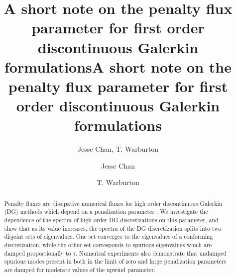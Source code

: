 \documentclass[preprint,10pt]{elsarticle}
\date{}
\author{Jesse Chan, T. Warburton}
\title{A short note on the penalty flux parameter for first order discontinuous Galerkin formulations}
\begin{document}
\begin{frontmatter}
\title{A short note on the penalty flux parameter for first order discontinuous Galerkin formulations}

\author[rice]{Jesse Chan}
\author[vt]{T. Warburton}
\address[rice]{Department of Computational and Applied Mathematics, Rice University, 6100 Main St, Houston, TX, 77005}
\address[vt]{Department of Mathematics, Virginia Tech, 225 Stanger Street, Blacksburg, VA 24061-0123}

\address{}

\begin{abstract}
Penalty fluxes are dissipative numerical fluxes for high order discontinuous Galerkin (DG) methods which depend on a penalization parameter \cite{warburton2013low, ye2016discontinuous}.  We investigate the dependence of the spectra of high order DG discretizations on this parameter, and show that as its value increases, the spectra of the DG discretization splits into two disjoint sets of eigenvalues.  One set converges to the eigenvalues of a conforming discretization, while the other set corresponds to spurious eigenvalues which are damped proportionally to $\tau$.  Numerical experiments also demonstrate that undamped spurious modes present in both in the limit of zero and large penalization parameters are damped for moderate values of the upwind parameter.  
\end{abstract}
\end{frontmatter}


\end{document}

